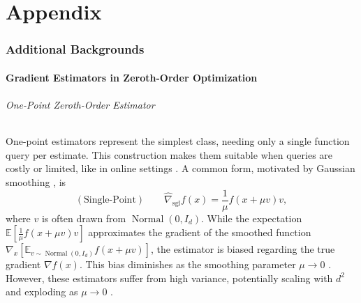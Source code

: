 \documentclass{article}
\newcommand{\EE}{\mathbb{E}}
\theoremstyle{definition}
\theoremstyle{plain}
\theoremstyle{remark}
\begin{document}



\newpage
\appendix

\part{Appendix} %
\parttoc %
\allowdisplaybreaks
\section{Additional Backgrounds}
\subsection{Gradient Estimators in Zeroth-Order Optimization}\label{appendix:gradient-estimators}
\paragraph{One-Point Zeroth-Order Estimator} One-point estimators represent the simplest class, needing only a single function query per estimate. This construction makes them suitable when queries are costly or limited, like in online settings \citep{flaxman2005online}. A common form, motivated by Gaussian smoothing \citep{nesterov2017random}, is $$(\text{Single-Point}) \qquad \hat{\nabla}_{\text{sgl}} f(x) = \frac{1}{\mu} f(x + \mu v) v,$$ 
where $v$ is often drawn from $\operatorname{Normal}(0, I_d)$. While the expectation $\mathbb{E}[\frac{1}{\mu} f(x + \mu v) v]$ approximates the gradient of the smoothed function $\nabla_x \left[\EE_{v \sim \operatorname{Normal}(0, I_d)} 
 f(x+\mu v)\right]$, the estimator is biased regarding the true gradient $\nabla f(x)$. This bias diminishes as the smoothing parameter $\mu\to 0$ \citep{berahas2022theoretical}. However, these estimators suffer from high variance, potentially scaling with $d^2$ and exploding as $\mu \to 0$ \citep{flaxman2005online}.   
\end{document}
